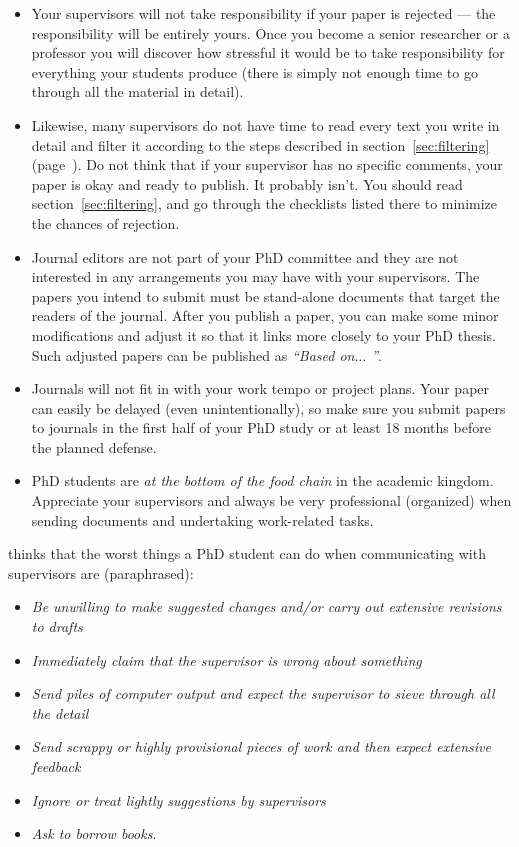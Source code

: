 \documentclass[graybox,envcountchap,sectrefs,UStrade]{svmono}
\begin{document}
\begin{itemize}
  \item Your supervisors will not take responsibility if your paper is rejected --- the responsibility will be entirely yours. Once you become a senior researcher or a professor you will discover how stressful it would be to take responsibility for everything your students produce (there is simply not enough time to go through all the material in detail).
  \item Likewise, many supervisors do not have time to read every text you write in detail and filter it according to the steps described in section~\ref{sec:filtering} (page~\pageref{sec:filtering}). Do not think that if your supervisor has no specific comments, your paper is okay and ready to publish. It probably isn't. You should read section~\ref{sec:filtering}, and go through the checklists listed there to minimize the chances of rejection.
  \item Journal editors are not part of your PhD committee and they are not interested in any arrangements you may have with your supervisors. The papers you intend to submit must be stand-alone documents that target the readers of the journal. After you publish a paper, you can make some minor modifications and adjust it so that it links more closely to your PhD thesis. Such adjusted papers can be published as \emph{``Based on$\ldots$ ''}.
  \item Journals will not fit in with your work tempo or project plans. Your paper can easily be delayed (even unintentionally), so make sure you submit papers to journals                              in the first half of your PhD study or at least 18 months before the planned defense.
  \item PhD students are \emph{at the bottom of the food chain} in the academic kingdom. Appreciate your supervisors and always be very professional (organized) when sending documents and undertaking work-related tasks.
\end{itemize}

\citet[p.67--68]{Creedy2008research} thinks that the worst things a PhD student can do when communicating with supervisors are (paraphrased):

\begin{itemize}
  \item \emph{Be unwilling to make suggested changes and/or carry out extensive revisions to drafts}
  \item \emph{Immediately claim that the supervisor is wrong about something}
  \item \emph{Send piles of computer output and expect the supervisor to sieve through all the detail}
  \item \emph{Send scrappy or highly provisional pieces of work and then expect extensive feedback}
  \item \emph{Ignore or treat lightly suggestions by supervisors}
  \item \emph{Ask to borrow books}.
\end{itemize}
\end{document}
